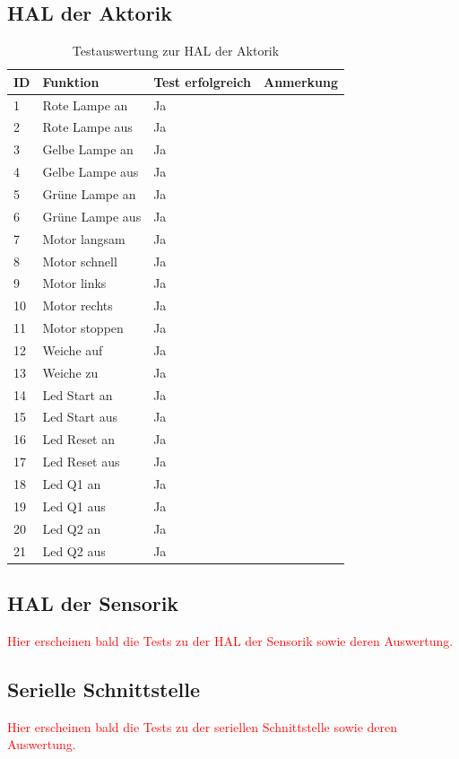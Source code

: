 \documentclass[a4paper, 11pt]{article}
\begin{document}
\subsection{HAL der Aktorik}
\begin{table}[h]
\center
\begin{tabularx}{\textwidth}{|l|X|X|X|}
\hline
\textbf{ID}&\textbf{Funktion}&\textbf{Test erfolgreich}&\textbf{Anmerkung}\\
\hline
1&Rote Lampe an&Ja&\\
\hline
2&Rote Lampe aus&Ja&\\
\hline
3&Gelbe Lampe an&Ja&\\
\hline
4&Gelbe Lampe aus&Ja&\\
\hline
5&Grüne Lampe an&Ja&\\
\hline
6&Grüne Lampe aus&Ja&\\
\hline
7&Motor langsam&Ja&\\
\hline
8&Motor schnell&Ja&\\
\hline
9&Motor links&Ja&\\
\hline
10&Motor rechts&Ja&\\
\hline
11&Motor stoppen&Ja&\\
\hline
12&Weiche auf&Ja&\\
\hline
13&Weiche zu&Ja&\\
\hline
14&Led Start an&Ja&\\
\hline
15&Led Start aus&Ja&\\
\hline
16&Led Reset an&Ja&\\
\hline
17&Led Reset aus&Ja&\\
\hline
18&Led Q1 an&Ja&\\
\hline
19&Led Q1 aus&Ja&\\
\hline
20&Led Q2 an&Ja&\\
\hline
21&Led Q2 aus&Ja&\\
\hline
\end{tabularx}
\caption{Testauswertung zur HAL der Aktorik}
\label{tstg1}
\end{table}

\subsection{HAL der Sensorik}
\textcolor{red}{Hier erscheinen bald die Tests zu der HAL der Sensorik sowie deren Auswertung.}

\subsection{Serielle Schnittstelle}
\textcolor{red}{Hier erscheinen bald die Tests zu der seriellen Schnittstelle sowie deren Auswertung.}
\end{document}
